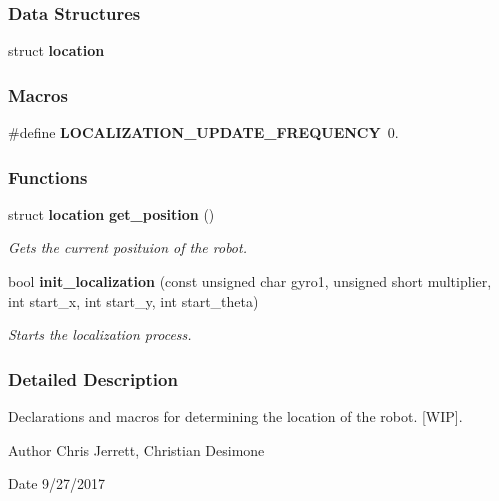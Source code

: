 \subsubsection*{Data Structures}
\begin{DoxyCompactItemize}
\item 
struct \textbf{ location}
\end{DoxyCompactItemize}
\subsubsection*{Macros}
\begin{DoxyCompactItemize}
\item 
\#define \textbf{ L\+O\+C\+A\+L\+I\+Z\+A\+T\+I\+O\+N\+\_\+\+U\+P\+D\+A\+T\+E\+\_\+\+F\+R\+E\+Q\+U\+E\+N\+CY}~0.
\end{DoxyCompactItemize}
\subsubsection*{Functions}
\begin{DoxyCompactItemize}
\item 
struct \textbf{ location} \textbf{ get\+\_\+position} ()
\begin{DoxyCompactList}\small\item\em Gets the current posituion of the robot. \end{DoxyCompactList}\item 
bool \textbf{ init\+\_\+localization} (const unsigned char gyro1, unsigned short multiplier, int start\+\_\+x, int start\+\_\+y, int start\+\_\+theta)
\begin{DoxyCompactList}\small\item\em Starts the localization process. \end{DoxyCompactList}\end{DoxyCompactItemize}


\subsubsection{Detailed Description}
Declarations and macros for determining the location of the robot. [W\+IP]. 

\begin{DoxyAuthor}{Author}
Chris Jerrett, Christian Desimone 
\end{DoxyAuthor}
\begin{DoxyDate}{Date}
9/27/2017 
\end{DoxyDate}


